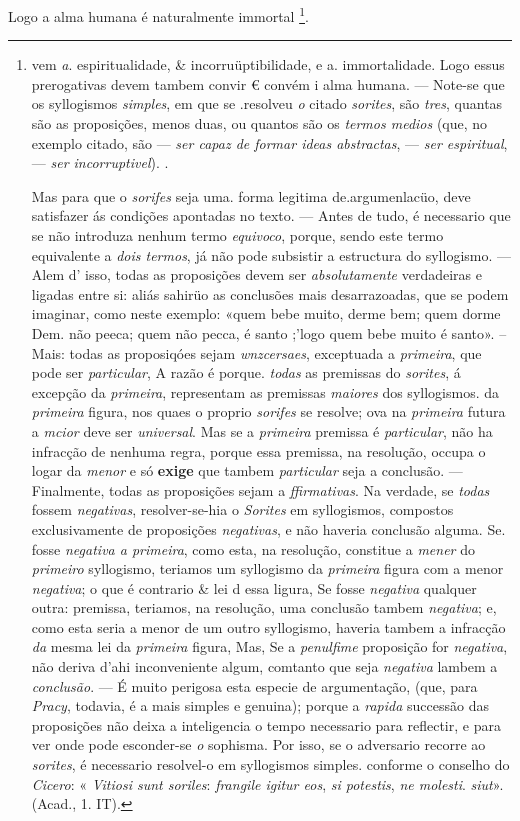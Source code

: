 Logo a alma humana é naturalmente immortal \footnote{vem \emph{a}. espiritualidade, \& incorruüptibilidade, e a. immortalidade. Logo essus prerogativas devem tambem convir € convém i alma humana. --- Note-se que os syllogismos \emph{simples}, em que se .resolveu \emph{o} citado \emph{sorites}, são \emph{tres}, quantas são as proposições, menos duas, ou quantos são os \emph{termos medios} (que, no exemplo citado, são --- \emph{ser capaz de formar ideas abstractas}, --- \emph{ser espiritual}, --- \emph{ser incorruptivel}). .\par Mas para que o \emph{sorifes} seja uma. forma legitima de.argumenlacüo, deve satisfazer ás condições apontadas no texto. --- Antes de tudo, é necessario que se não introduza nenhum termo \emph{equivoco}, porque, sendo este termo equivalente a \emph{dois termos}, já não pode subsistir a estructura do syllogismo. --- Alem d' isso, todas as proposições devem ser \emph{absolutamente} verdadeiras e ligadas entre si: aliás sahirüo as conclusões mais desarrazoadas, que se podem imaginar, como neste exemplo: «quem bebe muito, derme bem; quem dorme Dem. não peeca; quem não pecca, é santo ;'logo quem bebe muito é santo». -- Mais: todas as proposiqóes sejam \emph{wnzcersaes}, exceptuada a \emph{primeira}, que pode ser \emph{particular}, A razão é porque. \emph{todas} as premissas do \emph{sorites}, á excepção da \emph{primeira}, representam as premissas \emph{maiores} dos syllogismos. da \emph{primeira} figura, nos quaes o proprio \emph{sorifes} se resolve; ova na \emph{primeira} futura a \emph{mcior} deve ser \emph{universal}. Mas se a \emph{primeira} premissa é \emph{particular}, não ha infracção de nenhuma regra, porque essa premissa, na resolução, occupa o logar da \emph{menor} e só \textbf{exige} que tambem \emph{particular} seja a conclusão. --- Finalmente, todas as proposições sejam a \emph{ffirmativas}. Na verdade, se \emph{todas} fossem \emph{negativas}, resolver-se-hia o \emph{Sorites} em syllogismos, compostos exclusivamente de proposições \emph{negativas}, e não haveria conclusão alguma. Se. fosse \emph{negativa a primeira}, como esta, na resolução, constitue a \emph{mener} do \emph{primeiro} syllogismo, teriamos um syllogismo da \emph{primeira} figura com a menor \emph{negativa}; o que é contrario \& lei d essa ligura, Se fosse \emph{negativa} qualquer outra: premissa, teriamos, na resolução, uma conclusão tambem \emph{negativa}; e, como esta seria a menor de um outro syllogismo, haveria tambem a infracção \emph{da} mesma lei da \emph{primeira} figura, Mas, Se a \emph{penulfime} proposição for \emph{negativa}, não deriva d'ahi inconveniente algum, comtanto que seja \emph{negativa} lambem a \emph{conclusão}. --- É muito perigosa esta especie de argumentação, (que, para \emph{Pracy}, todavia, é a mais simples e genuina); porque a \emph{rapida} successão das proposições não deixa a inteligencia o tempo necessario para reflectir, e para ver onde pode esconder-se \emph{o} sophisma. Por isso, se o adversario recorre ao \emph{sorites}, é necessario resolvel-o em syllogismos simples. conforme o conselho do \emph{Cicero}: « \emph{Vitiosi sunt soriles}: \emph{frangile igitur eos}, \emph{si potestis}, \emph{ne molesti}. \emph{siut}». (Acad., 1. IT).}.

